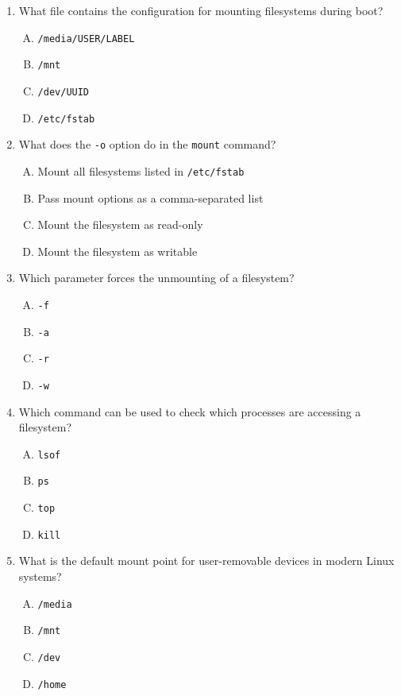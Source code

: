 \documentclass[a4paper]{report}
\begin{document}
\begin{enumerate}[1.]
    \item What file contains the configuration for mounting filesystems during boot?  
    \begin{enumerate}[A)]
        \item \texttt{/media/USER/LABEL}  
        \item \texttt{/mnt}  
        \item \texttt{/dev/UUID}  
        \item \texttt{/etc/fstab}  
    \end{enumerate}

    \item What does the \texttt{-o} option do in the \texttt{mount} command?  
    \begin{enumerate}[A)]
        \item Mount all filesystems listed in \texttt{/etc/fstab}  
        \item Pass mount options as a comma-separated list  
        \item Mount the filesystem as read-only  
        \item Mount the filesystem as writable  
    \end{enumerate}

    \item Which parameter forces the unmounting of a filesystem?  
    \begin{enumerate}[A)]
        \item \texttt{-f}  
        \item \texttt{-a}  
        \item \texttt{-r}  
        \item \texttt{-w}  
    \end{enumerate}

    \item Which command can be used to check which processes are accessing a filesystem?  
    \begin{enumerate}[A)]
        \item \texttt{lsof}  
        \item \texttt{ps}  
        \item \texttt{top}  
        \item \texttt{kill}  
    \end{enumerate}

    \item What is the default mount point for user-removable devices in modern Linux systems?  
    \begin{enumerate}[A)]
        \item \texttt{/media}  
        \item \texttt{/mnt}  
        \item \texttt{/dev}  
        \item \texttt{/home}  
    \end{enumerate}


\end{enumerate}
\end{document}
